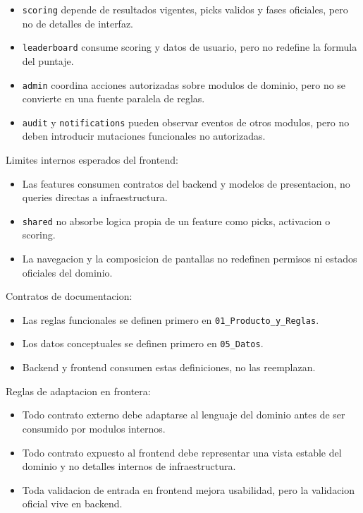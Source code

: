 \begin{itemize}
  \item \texttt{scoring} depende de resultados vigentes, picks validos y fases oficiales, pero no de detalles de interfaz.
  \item \texttt{leaderboard} consume scoring y datos de usuario, pero no redefine la formula del puntaje.
  \item \texttt{admin} coordina acciones autorizadas sobre modulos de dominio, pero no se convierte en una fuente paralela de reglas.
  \item \texttt{audit} y \texttt{notifications} pueden observar eventos de otros modulos, pero no deben introducir mutaciones funcionales no autorizadas.
\end{itemize}

Limites internos esperados del frontend:

\begin{itemize}
  \item Las features consumen contratos del backend y modelos de presentacion, no queries directas a infraestructura.
  \item \texttt{shared} no absorbe logica propia de un feature como picks, activacion o scoring.
  \item La navegacion y la composicion de pantallas no redefinen permisos ni estados oficiales del dominio.
\end{itemize}

Contratos de documentacion:

\begin{itemize}
  \item Las reglas funcionales se definen primero en \texttt{01\_Producto\_y\_Reglas}.
  \item Los datos conceptuales se definen primero en \texttt{05\_Datos}.
  \item Backend y frontend consumen estas definiciones, no las reemplazan.
\end{itemize}

Reglas de adaptacion en frontera:

\begin{itemize}
  \item Todo contrato externo debe adaptarse al lenguaje del dominio antes de ser consumido por modulos internos.
  \item Todo contrato expuesto al frontend debe representar una vista estable del dominio y no detalles internos de infraestructura.
  \item Toda validacion de entrada en frontend mejora usabilidad, pero la validacion oficial vive en backend.
\end{itemize}


